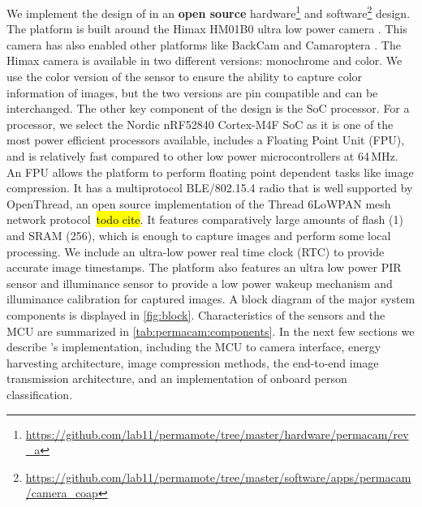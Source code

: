 We implement the design of \namec{} in an \textbf{open source}
hardware\footnote{\url{https://github.com/lab11/permamote/tree/master/hardware/permacam/rev_a}}
and software\footnote{\url{https://github.com/lab11/permamote/tree/master/software/apps/permacam/camera_coap}}
design. The platform is built around the Himax HM01B0 ultra low power camera \cite{hm01b0}. This camera has also enabled other platforms like BackCam \cite{josephson2019wireless} and Camaroptera \cite{nardello2019camaroptera}. The Himax camera is available in two different versions: monochrome and color. 
We use the color version of the sensor to ensure the ability to capture color information of images, but the two versions are pin compatible and can be interchanged. The other key component of the design is the SoC processor. 
For a processor, we select the Nordic nRF52840 Cortex-M4F SoC as it is one of the most power efficient processors available, includes a Floating Point Unit (FPU), and is relatively fast compared to other low power microcontrollers at 64\,MHz. 
An FPU allows the platform to perform floating point dependent tasks like image compression. 
It has a multiprotocol BLE/802.15.4 radio that is well supported by OpenThread, an open source implementation of the Thread 6LoWPAN mesh network protocol~\hl{todo cite}. 
It features comparatively large amounts of flash (1\ssi{\mega\byte}) and SRAM (256\ssi{\mega\byte}), which is enough to capture images and perform some local processing. 
We include an ultra-low power real time clock (RTC) to provide accurate image timestamps. 
The platform also features an ultra low power PIR sensor and illuminance sensor to provide a low power wakeup mechanism and illuminance calibration for captured images. 
A block diagram of the major system components is displayed in \cref{fig:block}. 
Characteristics of the sensors and the MCU are summarized in \cref{tab:permacam:components}. 
In the next few sections we describe \namec{}'s implementation, including the MCU to camera interface, energy harvesting architecture, image compression methods, the end-to-end image transmission architecture, and an implementation of onboard person classification.

